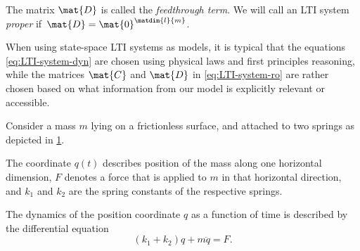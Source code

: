 The matrix $\mat{D}$ is called the \emph{feedthrough term}.
We will call an LTI system \emph{proper} if~$\mat{D}=\mat{0}^{\matdim{l}{m}}$.

\begin{remark}
    When using state-space LTI systems as models, it is typical that the equations \cref{eq:LTI-system-dyn} are chosen using physical laws and first principles reasoning, while the matrices $\mat{C}$ and $\mat{D}$ in \cref{eq:LTI-system-ro} are rather chosen based on what information from our model is explicitly relevant or accessible.
\end{remark}

\begin{example}
    \label{exa:sping-mass-lti}
    Consider a mass $m$ lying on a frictionless surface, and attached to two springs as depicted in \cref{fig:LTI-example_two-springs-one-mass}.

    \begin{figure}[h]\label{fig:LTI-example_two-springs-one-mass}
        \centering
    \end{figure}

    The coordinate $q(t)$ describes position of the mass along one horizontal dimension, $F$ denotes a force that is applied to $m$ in that horizontal direction, and $k_1$ and $k_2$ are the spring constants of the respective springs.

    The dynamics of the position coordinate $q$ as a function of time is described by the differential equation
    \begin{equation}\label{eq:LTI-exa-double-spring-equation}
        (k_1 + k_2)q + m \ddot q = F.
    \end{equation}


\end{example}
